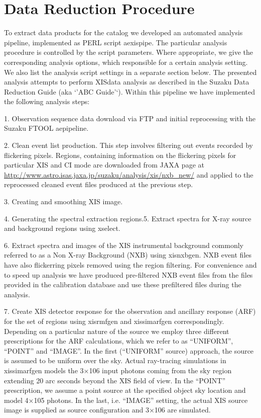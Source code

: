 \documentclass[letterpaper,10pt,english]{sphinxmanual}
\begin{document}
\chapter{Data Reduction Procedure}
\label{\detokenize{modeling:data-reduction-procedure}}\label{\detokenize{modeling::doc}}
To extract data products for the catalog we developed an automated analysis pipeline, implemented as PERL script aexispipe. The particular analysis procedure is controlled by the script parameters. Where appropriate, we give the corresponding analysis options, which responsible for a certain analysis setting. We also list the analysis script settings in a separate section below. The presented analysis attempts to perform XISdata analysis as described in the Suzaku Data Reduction Guide (aka `'ABC Guide'`). Within this pipeline we have implemented the following analysis steps:

1. Observation sequence data download via FTP and initial reprocessing with the Suzaku FTOOL aepipeline.

2. Clean event list production. This step involves filtering out events recorded by flickering pixels. Regions, containing information on the flickering pixels for particular XIS and CI mode are downloaded from JAXA page at \url{http://www.astro.isas.jaxa.jp/suzaku/analysis/xis/nxb\_new/} and applied to the reprocessed cleaned event files produced at the previous step. 

3. Creating and smoothing  XIS image.

4. Generating the spectral extraction regions.5. Extract spectra for X-ray source and background regions using xselect.

6. Extract spectra and images of the XIS instrumental background commonly referred to as a Non X-ray Background (NXB) using xisnxbgen. NXB event files have also flickerring pixels removed using the region filtering. For convenience and to speed up analysis we have produced pre-filtered NXB event files from the files provided in the calibration database and use these prefiltered files during the analysis.

7. Create XIS detector response for the observation and ancillary response (ARF) for the set of regions using xisrmfgen and xissimarfgen correspondingly. Depending on a particular nature of the source we employ three different prescriptions for the ARF calculations, which we refer to as ``UNIFORM'', ``POINT'' and ``IMAGE''. In the first (``UNIFORM'' source) approach, the source is assumed to be uniform over the sky. Actual ray-tracing simulations in xissimarfgen models the 3×106 input photons coming from the sky region extending 20 arc seconds beyond the XIS field of view. In the ``POINT'' prescription, we assume a point source at the specified object sky location and model 4×105 photons. In the last, i.e. ``IMAGE'' setting, the actual XIS source image is supplied as source configuration and 3×106 are simulated.
\end{document}
